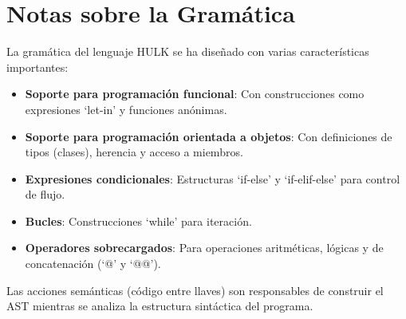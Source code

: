 \documentclass{article}
\begin{document}
\section{Notas sobre la Gramática}
La gramática del lenguaje HULK se ha diseñado con varias características importantes:

\begin{itemize}
    \item \textbf{Soporte para programación funcional}: Con construcciones como expresiones `let-in' y funciones anónimas.
    \item \textbf{Soporte para programación orientada a objetos}: Con definiciones de tipos (clases), herencia y acceso a miembros.
    \item \textbf{Expresiones condicionales}: Estructuras `if-else' y `if-elif-else' para control de flujo.
    \item \textbf{Bucles}: Construcciones `while' para iteración.
    \item \textbf{Operadores sobrecargados}: Para operaciones aritméticas, lógicas y de concatenación (`@' y `@@').
\end{itemize}

Las acciones semánticas (código entre llaves) son responsables de construir el AST mientras se analiza la estructura sintáctica del programa.
\end{document}
